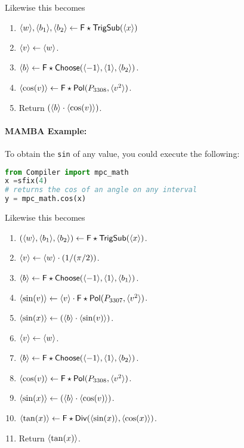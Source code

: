 Likewise this becomes
\begin{enumerate}

\item $\langle w \rangle, \langle b_1 \rangle, \langle b_2 \rangle \leftarrow \mathsf{F\star TrigSub}(\langle x \rangle)$
\item $\langle v \rangle \leftarrow \langle w \rangle$.
\item $\langle b \rangle \leftarrow \mathsf{F\star Choose}(\langle -1 \rangle,\langle 1 \rangle, \langle b_2 \rangle)$.
\item $\langle \cos(v) \rangle \leftarrow  \mathsf{F\star Pol}(P_{3308},\langle v^2 \rangle)$.
\item Return $(\langle b \rangle \cdot \langle \cos(v) \rangle)$.

\end{enumerate}

\paragraph{MAMBA Example:} To obtain the \verb|sin| of any value, you could execute the following:
\begin{lstlisting}[language={python}]
from Compiler import mpc_math
x =sfix(4)
# returns the cos of an angle on any interval
y = mpc_math.cos(x)
\end{lstlisting}

Likewise this becomes
\begin{enumerate} 

\item $(\langle w \rangle,\langle b_1 \rangle,\langle b_2 \rangle) \leftarrow \mathsf{F\star TrigSub}(\langle x \rangle)$.
\item $\langle v \rangle \leftarrow \langle w \rangle \cdot (1/(\pi/2))$.
\item $\langle b \rangle \leftarrow \mathsf{F\star Choose}(\langle -1 \rangle,\langle 1 \rangle, \langle b_1 \rangle)$.
\item $\langle \sin(v) \rangle \leftarrow \langle v \rangle \cdot \mathsf{F\star Pol}(P_{3307},\langle v^2 \rangle)$.
\item $\langle \sin(x) \rangle \leftarrow (\langle b \rangle \cdot \langle \sin(v) \rangle)$.
\item $\langle v \rangle \leftarrow \langle w \rangle$.
\item $\langle b \rangle \leftarrow \mathsf{F\star Choose}(\langle -1 \rangle,\langle 1 \rangle, \langle b_2 \rangle)$.
\item $\langle \cos(v) \rangle \leftarrow  \mathsf{F\star Pol}(P_{3308},\langle v^2 \rangle)$.
\item $\langle \sin(x) \rangle \leftarrow (\langle b \rangle \cdot \langle \cos(v) \rangle)$.
\item $\langle \tan(x) \rangle \leftarrow \mathsf{F\star Div}(\langle \sin(x) \rangle,\langle \cos(x) \rangle)$.
\item Return $\langle \tan(x) \rangle$.
\end{enumerate}

